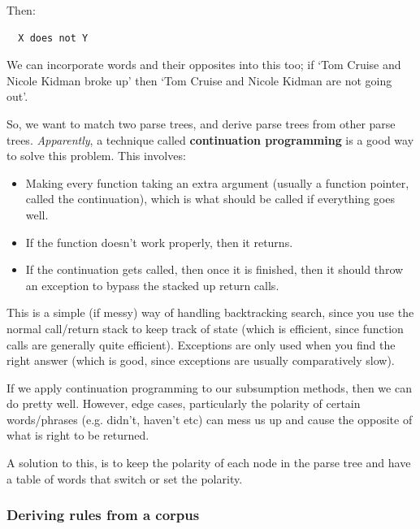 Then:

\begin{verbatim}
  X does not Y
\end{verbatim}

We can incorporate words and their opposites into this too; if `Tom Cruise and
Nicole Kidman broke up' then `Tom Cruise and Nicole Kidman are not going out'.

So, we want to match two parse trees, and derive parse trees from other parse
trees. \textit{Apparently}, a technique called \textbf{continuation programming}
is a good way to solve this problem. This involves:


\begin{itemize}
  \item Making every function taking an extra argument (usually a function 
    pointer, called the continuation), which is what should be called if 
    everything goes well.
  \item If the function doesn't work properly, then it returns.
  \item If the continuation gets called, then once it is finished, then it   
    should throw an exception to bypass the stacked up return calls.
\end{itemize}

This is a simple (if messy) way of handling backtracking search, since you use
the normal call/return stack to keep track of state (which is efficient, since
function calls are generally quite efficient). Exceptions are only used when you
find the right answer (which is good, since exceptions are usually comparatively
slow).

If we apply continuation programming to our subsumption methods, then we can do
pretty well. However, edge cases, particularly the polarity of certain
words/phrases (e.g. didn't, haven't etc) can mess us up and cause the opposite
of what is right to be returned.

A solution to this, is to keep the polarity of each node in the parse tree and
have a table of words that switch or set the polarity.

\subsubsection{Deriving rules from a corpus}

